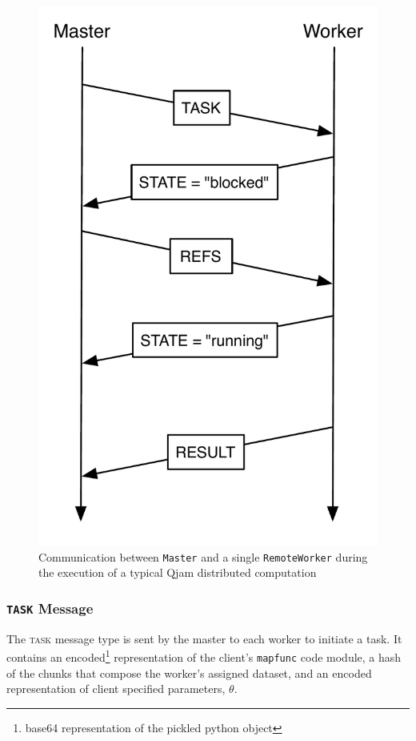 \documentclass[%
  final,
  notitlepage,
  narroweqnarray,
  inline,
]{ieee}
\begin{document}
\begin{figure}[!h]
  \centering
  \includegraphics[scale=0.35]{protocol-diagram.pdf}
  \caption{Communication between \texttt{Master} and a single
           \texttt{RemoteWorker} during the execution of a typical Qjam
           distributed computation}
  \label{ProtocolDiagram}
\end{figure}


\subsubsection{\texttt{TASK} Message}

The \textsc{task} message type is sent by the master to each worker to initiate
a task. It contains an encoded\footnote{base64 representation of the pickled
python object} representation of the client's \texttt{mapfunc} code module,
a hash of the chunks that compose the worker's assigned dataset, and an
encoded representation of client specified parameters, $\theta$.
\end{document}
